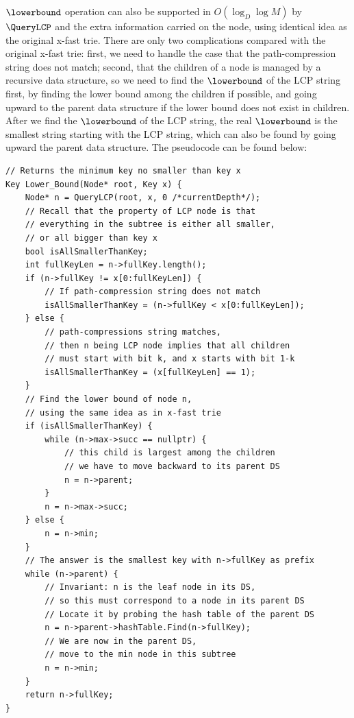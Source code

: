 \documentclass[11pt, usletter]{article}
\begin{document}
$\lowerbound$ operation can also be supported in $O(\log_D\log M)$ by $\QueryLCP$ and the extra information 
carried on the node, using identical idea as the original x-fast trie. 
There are only two complications compared with the original x-fast trie: 
first, we need to handle the case that the path-compression string does not match; 
second, that the children of a node is managed by a recursive data structure, 
so we need to find the $\lowerbound$ of the LCP string first, 
by finding the lower bound among the children if possible, 
and going upward to the parent data structure if the lower bound does not exist in children.
After we find the $\lowerbound$ of the LCP string, 
the real $\lowerbound$ is the smallest string starting with the LCP string, 
which can also be found by going upward the parent data structure.
The pseudocode can be found below:

\singlespacing\begin{codebox}
\begin{verbatim}
// Returns the minimum key no smaller than key x
Key Lower_Bound(Node* root, Key x) {
    Node* n = QueryLCP(root, x, 0 /*currentDepth*/);
    // Recall that the property of LCP node is that 
    // everything in the subtree is either all smaller, 
    // or all bigger than key x
    bool isAllSmallerThanKey;
    int fullKeyLen = n->fullKey.length();
    if (n->fullKey != x[0:fullKeyLen]) {
        // If path-compression string does not match
        isAllSmallerThanKey = (n->fullKey < x[0:fullKeyLen]);
    } else {
        // path-compressions string matches, 
        // then n being LCP node implies that all children 
        // must start with bit k, and x starts with bit 1-k
        isAllSmallerThanKey = (x[fullKeyLen] == 1);
    }
    // Find the lower bound of node n, 
    // using the same idea as in x-fast trie
    if (isAllSmallerThanKey) {
        while (n->max->succ == nullptr) {
            // this child is largest among the children
            // we have to move backward to its parent DS
            n = n->parent;
        }
        n = n->max->succ;
    } else {
        n = n->min;
    }
    // The answer is the smallest key with n->fullKey as prefix
    while (n->parent) {
        // Invariant: n is the leaf node in its DS,
        // so this must correspond to a node in its parent DS
        // Locate it by probing the hash table of the parent DS
        n = n->parent->hashTable.Find(n->fullKey);
        // We are now in the parent DS, 
        // move to the min node in this subtree 
        n = n->min;
    }
    return n->fullKey;
}
\end{verbatim}
\end{codebox}\doublespacing
\end{document}
